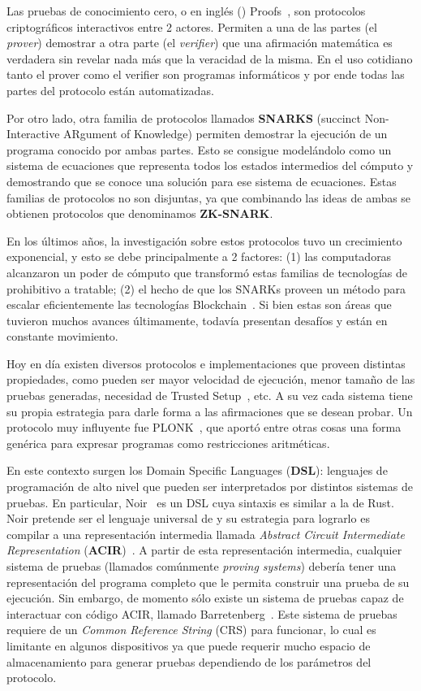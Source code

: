 Las pruebas de conocimiento cero, o en inglés \zeroknowledge (\zk) Proofs~\cite{goldwasser1985knowledge}, son protocolos criptográficos interactivos entre 2 actores. Permiten a una de las partes (el \textit{prover}) demostrar a otra parte (el \textit{verifier}) que una afirmación matemática es verdadera sin revelar nada más que la veracidad de la misma. En el uso cotidiano tanto el prover como el verifier son programas informáticos y por ende todas las partes del protocolo están automatizadas.

Por otro lado, otra familia de protocolos llamados \textbf{SNARKS} (succinct Non-Interactive ARgument of Knowledge) permiten demostrar la ejecución de un programa conocido por ambas partes. Esto se consigue modelándolo como un sistema de ecuaciones que representa todos los estados intermedios del cómputo y demostrando que se conoce una solución para ese sistema de ecuaciones. Estas familias de protocolos no son disjuntas, ya que combinando las ideas de ambas se obtienen protocolos que denominamos \textbf{ZK-SNARK}.

En los últimos años, la investigación sobre estos protocolos tuvo un crecimiento exponencial, y esto se debe principalmente a 2 factores: (1) las computadoras alcanzaron un poder de cómputo que transformó estas familias de tecnologías de prohibitivo a tratable; (2) el hecho de que los SNARKs proveen un método para escalar eficientemente las tecnologías Blockchain~\cite{huang2024data}. Si bien estas son áreas que tuvieron muchos avances últimamente, todavía presentan desafíos y están en constante movimiento.

Hoy en día existen diversos protocolos e implementaciones que proveen distintas propiedades, como pueden ser mayor velocidad de ejecución, menor tamaño de las pruebas generadas, necesidad de Trusted Setup~\cite{benarroch2019diving}, etc. A su vez cada sistema tiene su propia estrategia para darle forma a las afirmaciones que se desean probar. Un protocolo muy influyente fue PLONK~\cite{PLONK}, que aportó entre otras cosas una forma genérica para expresar programas como restricciones aritméticas. 

En este contexto surgen los Domain Specific Languages (\textbf{DSL}): lenguajes de programación de alto nivel que pueden ser interpretados por distintos sistemas de pruebas. En particular, Noir~\cite{noirIntroduction} es un DSL cuya sintaxis es similar a la de Rust. Noir pretende ser el lenguaje universal de \zk y su estrategia para lograrlo es compilar a una representación intermedia llamada \emph{Abstract Circuit Intermediate Representation} (\textbf{ACIR})~\cite{ACIR}. A partir de esta representación intermedia, cualquier sistema de pruebas (llamados comúnmente \textit{proving systems}) debería tener una representación del programa completo que le permita construir una prueba de su ejecución. Sin embargo, de momento sólo existe un sistema de pruebas capaz de interactuar con código ACIR, llamado Barretenberg~\cite{gabizon2020proposal}. Este sistema de pruebas requiere de un \emph{Common Reference String} (CRS) para funcionar, lo cual es limitante en algunos dispositivos ya que puede requerir mucho espacio de almacenamiento para generar pruebas dependiendo de los parámetros del protocolo.

